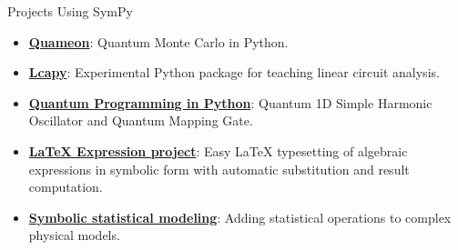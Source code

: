 \documentclass[xcolor=svgnames]{beamer}
\begin{document}
\begin{frame}{Projects Using SymPy}
\begin{itemize}
\item
  \href{http://quameon.sourceforge.net/}{\textbf{Quameon}}: Quantum
  Monte Carlo in Python.
\item
  \href{http://lcapy.elec.canterbury.ac.nz/}{\textbf{Lcapy}}:
  Experimental Python package for teaching linear circuit analysis.
\item
  \href{http://digitalcommons.calpoly.edu/cgi/viewcontent.cgi?article=1072\&context=physsp/}{\textbf{Quantum
  Programming in Python}}: Quantum 1D Simple Harmonic Oscillator and
  Quantum Mapping Gate.
\item
  \href{http://mech.fsv.cvut.cz/~stransky/software/latexexpr/doc/}{\textbf{LaTeX
  Expression project}}: Easy \LaTeX{} typesetting of algebraic expressions
  in symbolic form with automatic substitution and result computation.
\item
  \href{https://www.researchgate.net/publication/260585491_Symbolic_Statistics_with_SymPy/}{\textbf{Symbolic
  statistical modeling}}: Adding statistical operations to complex
  physical models.
\end{itemize}
\end{frame}



\end{document}
